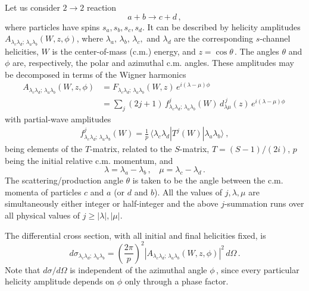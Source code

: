 \documentclass[prc,reprint,onecolumn,amsmath,amssymb,superscriptaddress]{revtex4-1}
\newcommand{\be}{\begin{equation}}
\newcommand{\ee}{\end{equation}}
\begin{document}
Let us consider $2\to2$ reaction
\be
	a+b\to c+d\,,
	\label{reac}
\ee
where particles have spins $s_a, s_b, s_c, s_d$. It can be described
by helicity amplitudes~\cite{jw}
	$A_{\lambda_c\lambda_d;\,\lambda_a\lambda_b}(W,z,\phi)$,
where $\lambda_a,\,\lambda_b,\,\lambda_c,$ and $\lambda_d$ are the
corresponding $s$-channel helicities, $W$ is the center-of-mass (c.m.) 
energy, and $z=\cos\theta\,$. The angles $\theta$ and $\phi$ are, respectively, 
the polar and azimuthal c.m. angles. These amplitudes may be decomposed 
in terms of the Wigner harmonics
\begin{align}
	A_{\lambda_c\lambda_d;\,\lambda_a\lambda_b}(W,z,\phi) &=
	F_{\lambda_c\lambda_d;\,\lambda_a\lambda_b}(W,z)\,
	e^{i(\lambda-\mu)\phi}\, \\
 &= \sum_j(2j+1)\,f^j_{\lambda_c\lambda_d;\,
	\lambda_a\lambda_b}(W)\,d^{\,j}_{\lambda\mu}(z)\,
	e^{i(\lambda-\mu)\phi}\,
	\label{h_amp}
\end{align}
with partial-wave amplitudes
\begin{align}
	f^j_{\lambda_c\lambda_d;\,\lambda_a\lambda_b}(W)=\frac{1}{ p}\,
	\langle\lambda_c\lambda_d|T^j(W)|\lambda_a\lambda_b\rangle~,
\end{align}
being elements of the $T$-matrix, related to the $S$-matrix,
$T=(S-1)/(2i)$, $p$ being the initial relative c.m. momentum, and
\be
	\lambda=\lambda_a-
	\lambda_b\,,~~~~\mu=\lambda_c-\lambda_d\,.
	\label{lamu}
\ee
The scattering/production angle $\theta$ is taken to be the angle
between the c.m. momenta of particles $c$ and $a$ (or $d$ and $b$). 
All the values of $j,\lambda,\mu$ are simultaneously either integer 
or half-integer and the above $j$-summation runs over all physical values of
$j\geq|\lambda|,|\mu|$.

The differential cross section, with all
initial and final helicities fixed, is~\cite{jw}
\be
	d\sigma_{\lambda_c\lambda_d;\,\lambda_a\lambda_b}=
	\left(\frac{2\pi}{p}\right)^{\!2} \left|A_{\lambda_c\lambda_d;\,
	\lambda_a\lambda_b}(W,z,\phi)\right|^2\,d\Omega\,.
	\label{crsec}
\ee
Note that $d\sigma/d\Omega$ is independent of the azimuthal angle
$\phi\,$, since every particular helicity amplitude depends on $\phi$
only through a phase factor.
\end{document}

